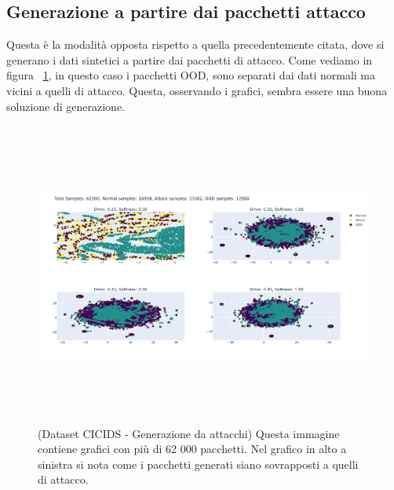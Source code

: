 \subsection{Generazione a partire dai pacchetti attacco}

Questa è la modalità opposta rispetto a quella precedentemente citata, dove si generano i dati sintetici a partire dai pacchetti di attacco. Come vediamo in figura ~\ref{fig:gen_CICIDS_attack_1}, in questo caso i pacchetti OOD, sono separati dai dati normali ma vicini a quelli di attacco. Questa, osservando i grafici, sembra essere una buona soluzione di generazione.
\begin{figure}[htpb]
    \centering
    \includegraphics[width=\textwidth,height=10cm,keepaspectratio=true]{img/gen_test/cicids/CICIDS18_attack_only_12k.png}
    \caption{
      (Dataset CICIDS - Generazione da attacchi) Questa immagine contiene grafici con più di 62 000 pacchetti. Nel grafico in alto a sinistra si nota come i pacchetti generati siano sovrapposti a quelli di attacco.
    }
    \label{fig:gen_CICIDS_attack_1}
\end{figure}


